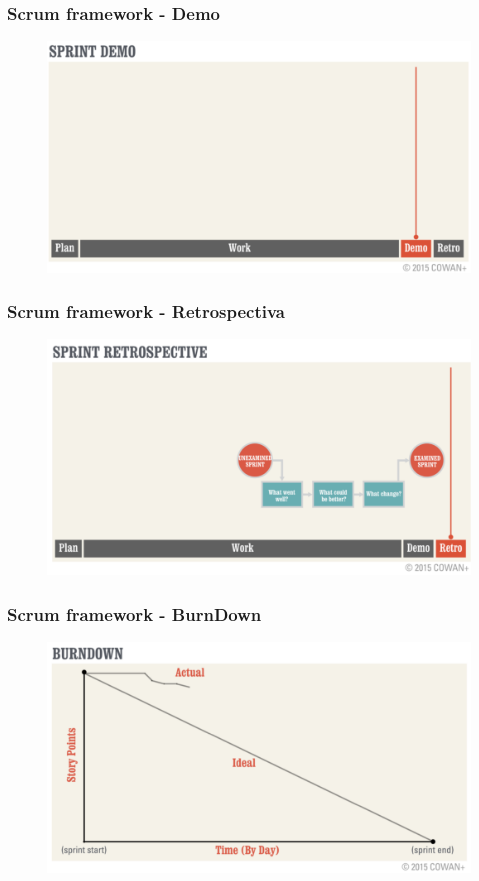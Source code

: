 \begin{frame}
 \frametitle{Scrum framework -  Demo}
  \begin{figure}
   \centering
   \includegraphics[width = \textwidth]{figs/fases_sprint_demo.png}
  \end{figure}
\end{frame}

\begin{frame}
 \frametitle{Scrum framework -  Retrospectiva}
  \begin{figure}
   \centering
   \includegraphics[width = \textwidth]{figs/fases_sprint_retrospective.png}
  \end{figure}
\end{frame}

\begin{frame}
 \frametitle{Scrum framework -  BurnDown}
  \begin{figure}
   \centering
   \includegraphics[width = \textwidth]{figs/fases_burndown.png}
  \end{figure}
\end{frame}

